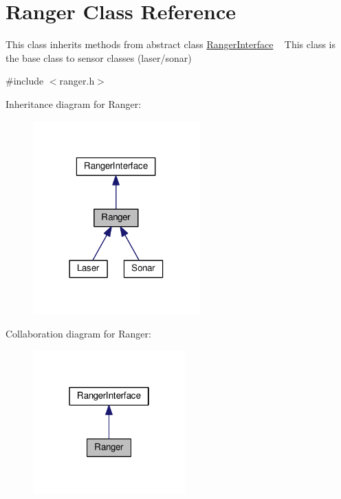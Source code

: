 \hypertarget{classRanger}{}\section{Ranger Class Reference}
\label{classRanger}


This class inherits methods from abstract class \hyperlink{classRangerInterface}{Ranger\+Interface} ~\newline
 This class is the base class to sensor classes (laser/sonar)  




{\ttfamily \#include $<$ranger.\+h$>$}



Inheritance diagram for Ranger\+:\nopagebreak
\begin{figure}[H]
\begin{center}
\leavevmode
\includegraphics[width=182pt]{classRanger__inherit__graph}
\end{center}
\end{figure}


Collaboration diagram for Ranger\+:\nopagebreak
\begin{figure}[H]
\begin{center}
\leavevmode
\includegraphics[width=166pt]{classRanger__coll__graph}
\end{center}
\end{figure}
